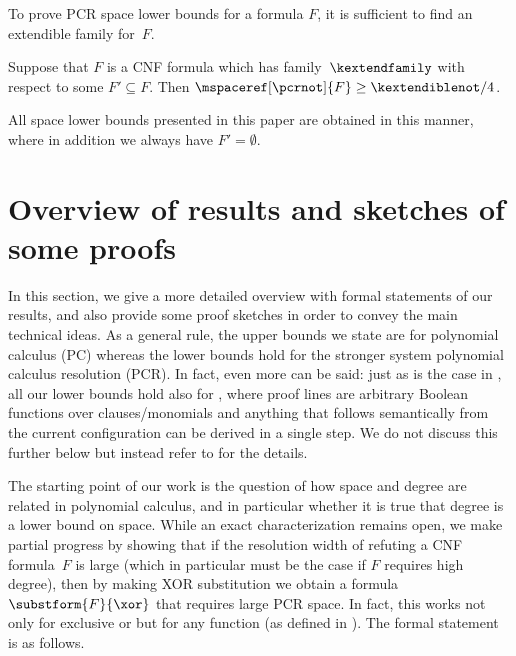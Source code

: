 \documentclass{toc}
\begin{document}
To prove PCR space lower bounds for a formula $F$, it is sufficient to
find an extendible family for~$F$.

\begin{theorem}
  \label{th:space-lower-bound}
Suppose that $F$ is a CNF formula which has \akextendible
  family~$\kextendfamily$
  with respect to some $F'\subseteq F$. Then
  $\mspaceref[\pcrnot]{F}\geq \kextendiblenot/4$.
\end{theorem}

All space lower bounds presented in this paper are obtained in this
  manner, where in addition we always have
  $F' = \emptyset$.
 
%
\section{Overview of results and sketches of some proofs}
\label{sec:overview-results}

In this section, we give
%
a more detailed overview with formal statements of our
results, and also provide some proof sketches in order to convey the
main technical ideas.
As a general rule, the upper bounds we state are for polynomial
  calculus (PC) whereas the lower bounds hold for the stronger system
  polynomial calculus resolution (PCR).
  In fact, even more can be said: just as is the case in
  \cite{ABRW02SpaceComplexity,FLNRT15SpaceCplx,BG15Framework},
  all our lower bounds
  hold also for
  ,
  where proof lines are arbitrary Boolean functions over
  clauses/monomials and anything that follows semantically from the
  current configuration can be derived in a single step. We do not
  discuss this further below but instead refer to
  for the details.


\label{sec:width-monomialspace}

The starting point of our work is the question of how space and degree
are related in polynomial calculus, and in particular whether it is
true that degree %
%
%
is a lower bound on space.  %
%
%
While an exact characterization remains
open, we make partial progress by showing that if the resolution width
of refuting a CNF formula~$F$ is large (which in particular must be
the case if $F$ requires high degree), then by making XOR
substitution we obtain a formula
$\substform{F}{\xor}$
that requires
large PCR space.
In fact, this works not only for exclusive or but for any
\nonauthor function
(as defined in ).
The formal statement
%
is as follows.
\end{document}
